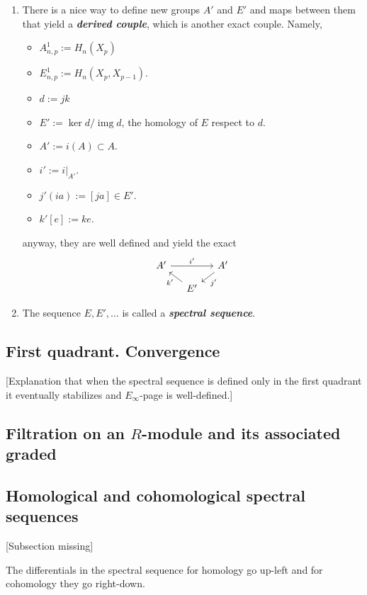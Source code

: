 \begin{enumerate}
	\item There is a nice way to define new groups $A'$ and $E'$ and maps between them that yield a \textit{\textbf{derived couple}}, which is another exact couple.	Namely,
		\begin{itemize}
			\item $A^1_{n,p}:=H_n(X_p)$
			\item $E^1_{n,p}:=H_n(X_p,X_{p-1})$.
			\item $d:=jk$
			\item $E':=\operatorname{ker} d/\operatorname{img}d$, the homology of $E$ respect to $d$.
			\item $A':=i(A)\subset A$.
			\item $i':=i|_{A'}$.
			\item $j'(ia):=[ja]\in E'$.
			\item $k'[e]:=ke$.
		\end{itemize}
	anyway, they are well defined and yield the exact
	\[\begin{tikzcd}[column sep=small,row sep=small]
		A'\arrow[rr,"i'"]&&A'\arrow[dl,"j'"]\\
		&E'\arrow[ul,"k'"]
	\end{tikzcd}\]

	\item The sequence $E,E',\ldots$ is called a \textit{\textbf{spectral sequence}}.
\end{enumerate}

\subsection{First quadrant. Convergence}

[Explanation that when the spectral sequence is defined only in the first quadrant it eventually stabilizes and $E_{\infty}$-page is well-defined.]

\subsection{Filtration on an \texorpdfstring{$R$}{R}-module and its associated graded}

\subsection{Homological and cohomological spectral sequences}

[Subsection missing]

\begin{remark}
	The differentials in the spectral sequence for homology go up-left and for cohomology they go right-down.
\end{remark}

